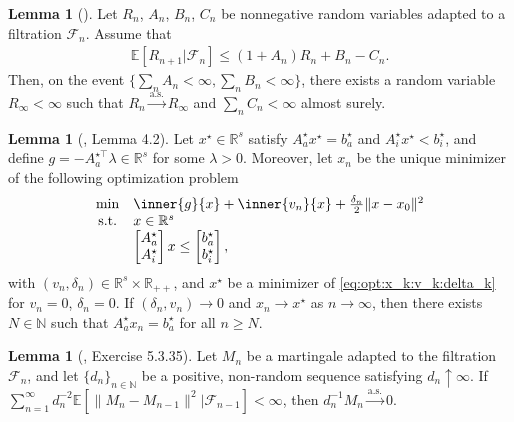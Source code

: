 \documentclass[11pt,a4paper]{article}
\theoremstyle{definition}
\newtheorem{lemma}[theorem]{Lemma}
\begin{document}
 
\begin{lemma}[{\citet[Theorem 1]{robbins1971convergence}}]
\label{lemma:robbins:siegmund}
Let $R_n$, $A_n$, $B_n$, $C_n$ be nonnegative random variables adapted to a filtration $\mathcal F_n$. Assume that 
\begin{align*}
    \mathbb E[R_{n+1}| \mathcal F_{n}] \leq (1+A_n)R_n + B_n - C_n.
\end{align*}
Then, on the event $\{\sum_n A_n < \infty, \sum_n B_n < \infty\}$, there exists a random variable $R_\infty < \infty$ such that $R_n \overset{\text{a.s.}}{\to} R_\infty$ and $\sum_n C_n < \infty$ almost surely.
\end{lemma}

\begin{lemma}[\citet{duchi2021asymptotic}, Lemma 4.2]
\label{lemma:duchi:4.2}
Let $x^\star \in \mathbb R^s$ satisfy $A_{a}^\star x^\star = b_a^\star$ and $A_{i}^\star x^\star < b_i^\star$, and define $g = - A_a^{\star\top} \lambda \in \mathbb R^s$ for some $\lambda >0$. Moreover, let $x_n$ be the unique minimizer of the following optimization problem
\begin{align}
\label{eq:opt:x_k:v_k:delta_k}
\begin{array}{cl}
    \min &\inner{g}{x} + \inner{v_n}{x} + \frac{\delta_n}{2} \|x - x_0\|^2 \\
    \text{s.t.} & x \in \mathbb R^s \\
    ~ & \begin{bmatrix} A_{a}^\star \\ A_{i}^\star \end{bmatrix}x \leq \begin{bmatrix} b_a^\star \\ b_i^\star \end{bmatrix},
\end{array}
\end{align}
with $(v_n,\delta_n) \in \mathbb R^s \times \mathbb R_{++}$, and $x^\star$ be a minimizer of \eqref{eq:opt:x_k:v_k:delta_k} for $v_n = 0$, $\delta_n = 0$. If $(\delta_n, v_n) \to 0$ and $x_n \to x^\star$ as $n \to \infty$, then there exists $N \in \mathbb N$ such that $A_{a}^\star x_n = b_a^\star$ for all $n \geq N$.
\end{lemma}


\begin{lemma}[\citet{dembo2016lecture}, Exercise 5.3.35]
\label{lemma:conv:martingale}
Let $M_n$ be a martingale adapted to the filtration $\mathcal F_n$, and let $\{d_n\}_{n\in \mathbb N}$ be a positive, non-random sequence satisfying $d_n \uparrow \infty$. If $\sum_{n=1}^\infty d_n^{-2} \mathbb E[\|M_{n}-M_{n-1}\|^2 | \mathcal F_{n-1}] < \infty$, then $d_n^{-1}M_n \overset{\text{a.s.}}{\to} 0$.
\end{lemma}
\end{document}
